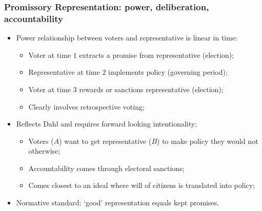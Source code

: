 \documentclass[aspectratio=169]{beamer}
\theoremstyle{principle}
\begin{document}
\begin{frame}
\frametitle{Promissory Representation: power, deliberation, accountability}
\begin{itemize}
\item Power relationship between voters and representative is linear in time:
\begin{itemize}
\item Voter at time $1$ extracts a promise from representative (election);
\item Representative at time $2$ implements policy (governing period);
\item Voter at time $3$ rewards or sanctions representative (election);
\item Clearly involves retrospective voting;
\end{itemize}
\bigskip
\bigskip
\item Reflects Dahl and requires forward looking intentionality;
\begin{itemize}
\item Voters ($A$) want to get representative ($B$) to make policy they would not otherwise;
\item Accountability comes through electoral sanctions;
\item Comes closest to an ideal where will of citizens is translated into policy;
\end{itemize}
\bigskip
\bigskip
\item Normative standard: `good' representation equals kept promises.
\end{itemize}

\end{frame}
\end{document}
